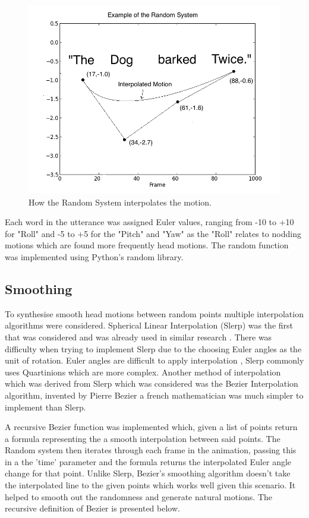 \documentclass[bsc,frontabs,twoside,singlespacing,parskip,deptreport]{infthesis}
\begin{document}
\begin{figure}
	\includegraphics[width=1.0\textwidth]{example_interp.png}
	\caption{How the Random System interpolates the motion.}
\end{figure}

Each word in the utterance was assigned Euler values, ranging from -10 to +10 for "Roll" and -5 to +5 for the "Pitch" and "Yaw" as the "Roll" relates to nodding motions which are found more frequently head motions. The random function was implemented using Python's random library.

\subsection{Smoothing}

To synthesise smooth head motions between random points multiple interpolation algorithms were considered. Spherical Linear Interpolation (Slerp) was the first that was considered and was already used in similar research \cite{rigid_head_motion}. There was difficulty when trying to implement Slerp due to the choosing Euler angles as the unit of rotation. Euler angles are difficult to apply interpolation \cite{quartionions}, Slerp commonly uses Quartinions which are more complex. Another method of interpolation which was derived from Slerp which was considered was the Bezier Interpolation algorithm, invented by Pierre Bezier a french mathematician was much simpler to implement than Slerp.

A recursive Bezier function was implemented which, given a list of points return a formula representing the a smooth interpolation between said points. The Random system then iterates through each frame in the animation, passing this in a the 'time' parameter and the formula returns the interpolated Euler angle change for that point. Unlike Slerp, Bezier's smoothing algorithm doesn't take the interpolated line to the given points which works well given this scenario. It helped to smooth out the randomness and generate natural motions. The recursive definition of Bezier is presented below. 
\end{document}
